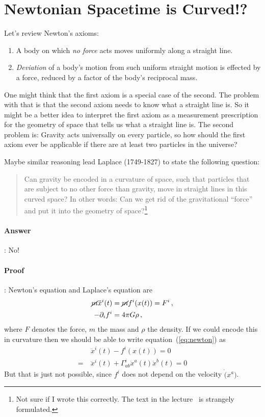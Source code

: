 \documentclass[11pt, a4paper, twocolumn]{article} %
\begin{document}
\section{Newtonian Spacetime is Curved!?}
Let's review Newton's axioms:
\begin{enumerate}
    \item A body on which \textit{no force} acts moves uniformly along a straight line.
    \item \textit{Deviation} of a body's motion from such uniform straight motion is effected by a
        force, reduced by a factor of the body's reciprocal mass.
\end{enumerate}
One might think that the first axiom is a special case of the second.
The problem with that is that the second axiom needs to know what a 
straight line is.
So it might be a better idea to interpret the first axiom as a measurement prescription
for the geometry of space that tells us what a straight line is.
The second problem is: Gravity acts universally on every particle, so how should
the first axiom ever be applicable if there are at least two particles in the
universe?

Maybe similar reasoning lead Laplace (1749-1827) to state the following question:
\begin{quote}
    Can gravity be encoded in a curvature of space, such that particles that are subject
    to no other force than gravity, move in straight lines in this curved space?
    In other words: Can we get rid of the gravitational ``force'' and put it into the
    geometry of space?\footnote{%
        Not sure if I wrote this correctly. The text in the lecture~\cite{Schuller15}
    is strangely formulated.}
\end{quote}
\paragraph{Answer}: No!
\paragraph{Proof}:
Newton's equation and Laplace's equation are
\begin{align}
    \label{eq:newton} \cancel{m} \ddot{x}^i(t) &= \cancel{m} f^{i}(x(t)) = F^i\,,\\
    -\partial_i f^i &= 4\pi G \rho\,,\\
\end{align}
where $F$ denotes the force, $m$ the mass and $\rho$ the density.
If we could encode this in curvature then we should be able to write equation~(\ref{eq:newton})
as
\begin{align}
    &\ddot{x}^i(t) - f^i(x(t)) = 0\\
    =~&\ddot{x}^i(t) + \Gamma^i_{ab}\dot{x}^a(t)\dot{x}^b(t) = 0
\end{align}
But that is just not possible, since $f^i$ does not depend on the velocity $\dot(x^a)$.
\end{document}
